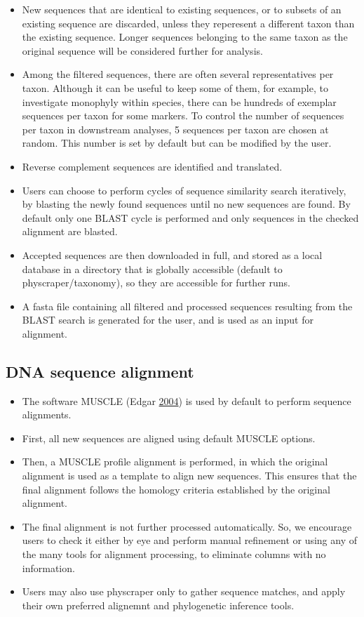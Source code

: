 \documentclass[]{article}
\providecommand{\tightlist}{%
  \setlength{\itemsep}{0pt}\setlength{\parskip}{0pt}}
\begin{document}
\begin{itemize}
\item
  New sequences that are identical to existing sequences, or to subsets of an existing sequence are discarded, unless they reperesent a different taxon than the existing sequence.
  Longer sequences belonging to the
  same taxon as the original sequence will be considered further for analysis.
\item
  Among the filtered sequences, there are often several representatives per taxon.
  Although it can be useful to keep some of them, for example, to investigate monophyly
  within species, there can be hundreds of exemplar sequences per taxon for some markers.
  To control the number of sequences per taxon in downstream analyses,
  5 sequences per taxon are chosen at random. This number is set by default but can be modified by the user.
\item
  Reverse complement sequences are identified and translated.
\item
  Users can choose to perform cycles of sequence similarity search iteratively, by blasting the newly found sequences until no new sequences are found. By default only one BLAST cycle is performed and only sequences in the checked alignment are blasted.
\item
  Accepted sequences are then downloaded in full, and stored as a local database in a directory that is globally accessible (default to physcraper/taxonomy), so they are accessible for further runs.
\item
  A fasta file containing all filtered and processed sequences resulting from the BLAST search is generated for the user, and is used as an input for alignment.
\end{itemize}

\hypertarget{dna-sequence-alignment}{%
\subsection{DNA sequence alignment}\label{dna-sequence-alignment}}

\begin{itemize}
\tightlist
\item
  The software MUSCLE (Edgar \protect\hyperlink{ref-edgar2004muscle}{2004}) is used by default to perform sequence alignments.
\item
  First, all new sequences are aligned using default MUSCLE options.
\item
  Then, a MUSCLE profile alignment is performed, in which the original alignment
  is used as a template to align new sequences. This ensures that the final alignment
  follows the homology criteria established by the original alignment.
\item
  The final alignment is not further processed automatically. So, we encourage users
  to check it either by eye and perform manual refinement or using any of the many
  tools for alignment processing, to eliminate columns with no information.
\item
  Users may also use physcraper only to gather sequence matches, and apply their own preferred alignemnt and phylogenetic inference tools.
\end{itemize}
\end{document}

